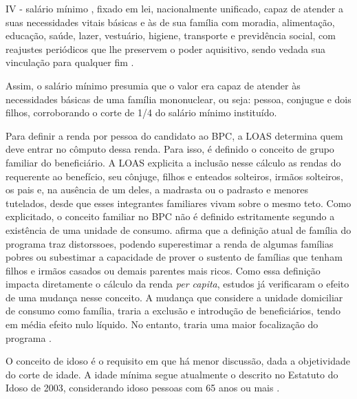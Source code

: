 \documentclass[
	12pt,				%
	openright,			%
	twoside,			%
	a4paper,			%
	english,			%
	french,				%
	spanish,			%
	brazil				%
	]{abntex2}
\begin{document}
		 \begin{citacao}
		 	IV - salário mínimo , fixado em lei, nacionalmente unificado, capaz de atender a suas necessidades vitais básicas e às de sua família com moradia, alimentação, educação, saúde, lazer, vestuário, higiene, transporte e previdência social, com reajustes periódicos que lhe preservem o poder aquisitivo, sendo vedada sua vinculação para qualquer fim \cite[Art. 7{\textordmasculine}]{brasil1988}.
		 	
		 \end{citacao}
	 
	  Assim, o salário mínimo presumia que o valor era capaz de atender às necessidades básicas de uma família mononuclear, ou seja: pessoa, conjugue e dois filhos, corroborando o corte de 1/4 do salário mínimo instituído.
		

		Para definir a renda por pessoa do candidato ao BPC, a LOAS determina quem deve entrar no cômputo dessa renda. Para isso, é definido o conceito de grupo familiar do beneficiário. A LOAS explicita a inclusão nesse cálculo as rendas do requerente ao benefício, seu cônjuge, filhos e enteados solteiros, irmãos solteiros, os pais e, na ausência de um deles, a madrasta ou o padrasto e menores tutelados, desde que esses integrantes familiares vivam sobre o mesmo teto. Como explicitado, o conceito familiar no BPC não é definido estritamente segundo a existência de uma unidade de consumo.  afirma que a definição atual de família do programa traz distorssoes, podendo superestimar a renda de algumas famílias pobres ou subestimar a capacidade de prover o sustento de famílias que tenham filhos e irmãos casados ou demais parentes mais ricos. Como essa definição impacta diretamente o cálculo da renda \textit{per capita}, estudos já verificaram o efeito de uma mudança nesse conceito. A mudança que considere a unidade domiciliar de consumo como família, traria a exclusão e introdução de beneficiários, tendo em média efeito nulo líquido. No entanto, traria uma maior focalização do programa \cite{medeiros2009mudancca,fambpcfreitas}.
		
		O conceito de idoso é o requisito em que há menor discussão, dada a objetividade do corte de idade. A idade mínima segue atualmente o descrito no Estatuto do Idoso de 2003, considerando idoso pessoas com 65 anos ou mais \cite{lei_idoso2003}. 
		
\end{document}
